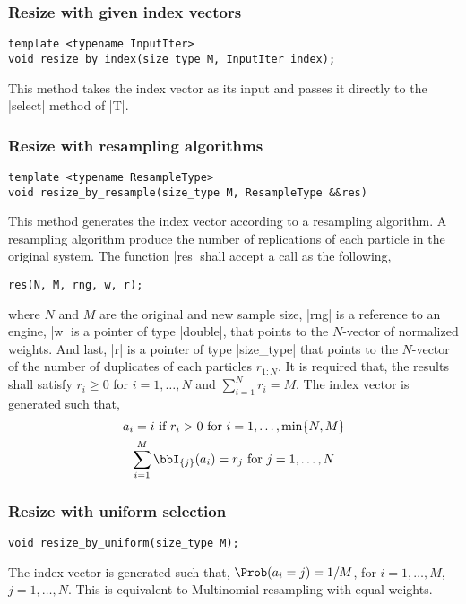 \subsubsection{Resize with given index vectors}

\begin{verbatim}
template <typename InputIter>
void resize_by_index(size_type M, InputIter index);
\end{verbatim}
This method takes the index vector as its input and passes it directly to the
|select| method of |T|.

\subsubsection{Resize with resampling algorithms}

\begin{verbatim}
template <typename ResampleType>
void resize_by_resample(size_type M, ResampleType &&res)
\end{verbatim}
This method generates the index vector according to a resampling algorithm. A
resampling algorithm produce the number of replications of each particle in the
original system. The function |res| shall accept a call as the following,
\begin{verbatim}
res(N, M, rng, w, r);
\end{verbatim}
where $N$ and $M$ are the original and new sample size, |rng| is a reference to
an \rng engine, |w| is a pointer of type |double|, that points to the
$N$-vector of normalized weights. And last, |r| is a pointer of type
|size_type| that points to the $N$-vector of the number of duplicates of each
particles $r_{1:N}$. It is required that, the results shall satisfy $r_i\ge0$
for $i=1,\dots,N$ and $\sum_{i=1}^N r_i = M$. The index vector is generated
such that,
\begin{gather*}
  a_i = i \text{ if } r_i > 0 \text{ for } i = 1,\dots,\min\{N, M\} \\
  \sum_{i=1}^M\bbI_{\{j\}}(a_i) = r_j \text{ for } j = 1,\dots,N
\end{gather*}

\subsubsection{Resize with uniform selection}

\begin{verbatim}
void resize_by_uniform(size_type M);
\end{verbatim}
The index vector is generated such that, $\Prob(a_i = j) = 1/M$, for $i =
1,\dots,M$, $j = 1,\dots,N$. This is equivalent to Multinomial resampling with
equal weights.

